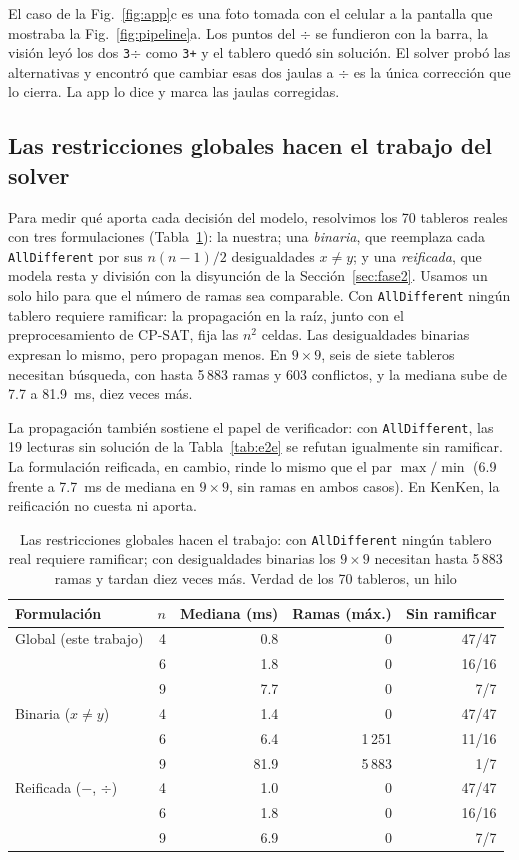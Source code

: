 \documentclass[conference]{IEEEtran}
\begin{document}
El caso de la Fig.~\ref{fig:app}c es una foto tomada con el celular a la pantalla que mostraba la Fig.~\ref{fig:pipeline}a. Los puntos del $\div$ se fundieron con la barra, la visión leyó los dos \texttt{3}$\div$ como \texttt{3+} y el tablero quedó sin solución. El solver probó las alternativas y encontró que cambiar esas dos jaulas a $\div$ es la única corrección que lo cierra. La app lo dice y marca las jaulas corregidas.

\subsection{Las restricciones globales hacen el trabajo del solver}\label{sec:globales}
Para medir qué aporta cada decisión del modelo, resolvimos los 70 tableros reales con tres formulaciones (Tabla~\ref{tab:formulaciones}): la nuestra; una \emph{binaria}, que reemplaza cada \texttt{AllDifferent} por sus $n(n-1)/2$ desigualdades $x \neq y$; y una \emph{reificada}, que modela resta y división con la disyunción de la Sección~\ref{sec:fase2}. Usamos un solo hilo para que el número de ramas sea comparable. Con \texttt{AllDifferent} ningún tablero requiere ramificar: la propagación en la raíz, junto con el preprocesamiento de CP-SAT, fija las $n^2$ celdas. Las desigualdades binarias expresan lo mismo, pero propagan menos. En $9 \times 9$, seis de siete tableros necesitan búsqueda, con hasta 5\,883 ramas y 603 conflictos, y la mediana sube de 7.7 a 81.9~ms, diez veces más.

La propagación también sostiene el papel de verificador: con \texttt{AllDifferent}, las 19 lecturas sin solución de la Tabla~\ref{tab:e2e} se refutan igualmente sin ramificar. La formulación reificada, en cambio, rinde lo mismo que el par $\max/\min$ (6.9 frente a 7.7~ms de mediana en $9 \times 9$, sin ramas en ambos casos). En KenKen, la reificación no cuesta ni aporta.

\begin{table}[t]
\caption{Las restricciones globales hacen el trabajo: con \texttt{AllDifferent} ningún tablero real requiere ramificar; con desigualdades binarias los $9 \times 9$ necesitan hasta 5\,883 ramas y tardan diez veces más. Verdad de los 70 tableros, un hilo}
\label{tab:formulaciones}
\centering
\setlength{\tabcolsep}{4pt}
\begin{tabular}{lrrrr}
\toprule
Formulación & $n$ & Mediana (ms) & Ramas (máx.) & Sin ramificar \\
\midrule
Global (este trabajo) & 4 & 0.8 & 0 & 47/47 \\
 & 6 & 1.8 & 0 & 16/16 \\
 & 9 & 7.7 & 0 & 7/7 \\
\midrule
Binaria ($x \neq y$) & 4 & 1.4 & 0 & 47/47 \\
 & 6 & 6.4 & 1\,251 & 11/16 \\
 & 9 & 81.9 & 5\,883 & 1/7 \\
\midrule
Reificada ($-$, $\div$) & 4 & 1.0 & 0 & 47/47 \\
 & 6 & 1.8 & 0 & 16/16 \\
 & 9 & 6.9 & 0 & 7/7 \\
\bottomrule
\end{tabular}
\end{table}
\end{document}
